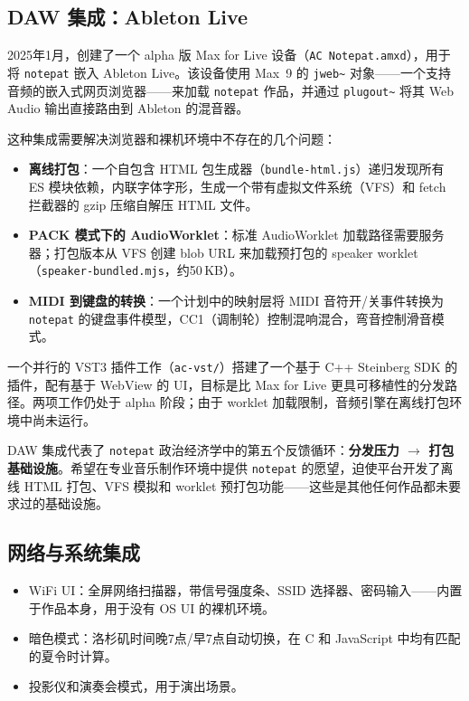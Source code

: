 \documentclass[10pt,letterpaper,twocolumn]{article}
\begin{document}
\subsection{DAW 集成：Ableton Live}

2025年1月，创建了一个 alpha 版 Max for Live 设备（\texttt{AC Notepat.amxd}），用于将 \texttt{notepat} 嵌入 Ableton Live。该设备使用 Max~9 的 \texttt{jweb\textasciitilde} 对象——一个支持音频的嵌入式网页浏览器——来加载 \texttt{notepat} 作品，并通过 \texttt{plugout\textasciitilde} 将其 Web Audio 输出直接路由到 Ableton 的混音器。

这种集成需要解决浏览器和裸机环境中不存在的几个问题：

\begin{itemize}
  \item \textbf{离线打包}：一个自包含 HTML 包生成器（\texttt{bundle-html.js}）递归发现所有 ES 模块依赖，内联字体字形，生成一个带有虚拟文件系统（VFS）和 fetch 拦截器的 gzip 压缩自解压 HTML 文件。
  \item \textbf{PACK 模式下的 AudioWorklet}：标准 AudioWorklet 加载路径需要服务器；打包版本从 VFS 创建 blob URL 来加载预打包的 speaker worklet（\texttt{speaker-bundled.mjs}，约50\,KB）。
  \item \textbf{MIDI 到键盘的转换}：一个计划中的映射层将 MIDI 音符开/关事件转换为 \texttt{notepat} 的键盘事件模型，CC1（调制轮）控制混响混合，弯音控制滑音模式。
\end{itemize}

一个并行的 VST3 插件工作（\texttt{ac-vst/}）搭建了一个基于 C++ Steinberg SDK 的插件，配有基于 WebView 的 UI，目标是比 Max for Live 更具可移植性的分发路径。两项工作仍处于 alpha 阶段；由于 worklet 加载限制，音频引擎在离线打包环境中尚未运行。

DAW 集成代表了 \texttt{notepat} 政治经济学中的第五个反馈循环：\textbf{分发压力 $\rightarrow$ 打包基础设施}。希望在专业音乐制作环境中提供 \texttt{notepat} 的愿望，迫使平台开发了离线 HTML 打包、VFS 模拟和 worklet 预打包功能——这些是其他任何作品都未要求过的基础设施。

\subsection{网络与系统集成}

\begin{itemize}
  \item WiFi UI：全屏网络扫描器，带信号强度条、SSID 选择器、密码输入——内置于作品本身，用于没有 OS UI 的裸机环境。
  \item 暗色模式：洛杉矶时间晚7点/早7点自动切换，在 C 和 JavaScript 中均有匹配的夏令时计算。
  \item 投影仪和演奏会模式，用于演出场景。
\end{itemize}
\end{document}
